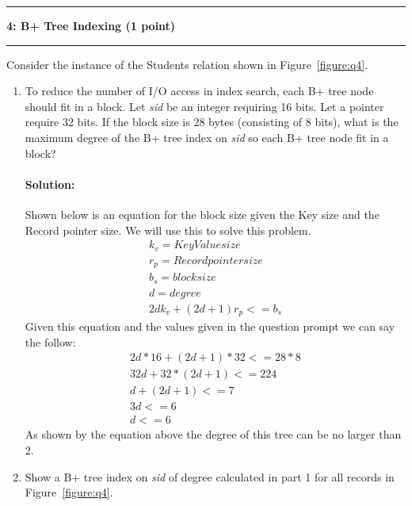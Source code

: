 \documentclass[11pt]{article}
\newcommand\question[2]{\vspace{.25in}\hrule\textbf{#1: #2}\vspace{.5em}\hrule\vspace{.10in}}
\begin{document}
\question{4}{B+ Tree Indexing (1 point)}
Consider the instance of the Students relation shown in Figure~\ref{figure:q4}. 
\begin{enumerate}
	
	\item To reduce the number of I/O access in index search, each B+ tree node should fit in a block. Let {\it sid} be an integer requiring 16 bits. Let a pointer require 32 bits.
	If the block size is 28 bytes (consisting of 8 bits), what is the maximum degree of the B+ tree index on {\it sid} so each B+ tree node fit in a block?
	
	\paragraph{Solution:} \hfill \break
	Shown below is an equation for the block size given the Key size and the Record pointer size. We will use this to solve this problem.\\
	
\begin{multline}
	k_v = Key Value size \\
	r_p = Record pointer size \\
	b_s = block size \\
	d = degree\\
	2d k_v + (2d + 1) r_p <= b_s 
\end{multline}
	Given this equation and the values given in the question prompt we can say the follow:\\
	
	\begin{multline}
		2d * 16 + (2d + 1) * 32 <= 28 * 8\\
		32d + 32*(2d + 1) <= 224\\
		d + (2d + 1) <= 7\\
		3d <= 6\\
		d <= 6
	\end{multline}
	As shown by the equation above the degree of this tree can be no larger than 2.\\
	

	\item Show a B+ tree index on {\it sid} of degree calculated in part 1 for all records in Figure~\ref{figure:q4}.
	

\end{enumerate}
\end{document}
